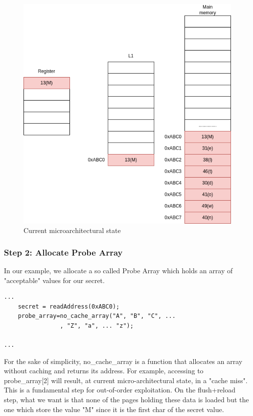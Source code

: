 \begin{figure}[!h]
    \includegraphics[scale=0.25]{img/meltdown-step-one.png}
    \caption{Current microarchitectural state}
\end{figure}


\subsubsection{Step 2: Allocate Probe Array}
In our example, we allocate a so called Probe Array which holds an array of "acceptable" values for our secret.
\begin{Verbatim}[fontsize=\small]
...
    secret = readAddress(0xABC0);
    probe_array=no_cache_array("A", "B", "C", ... 
                , "Z", "a", ... "z");

...
\end{Verbatim}
For the sake of simplicity, no\_cache\_array is a function that allocates an array without caching and returns its address.
For example, accessing to probe\_array[2] will result, at current micro-architectural state, in a "cache miss".
This is a fundamental step for out-of-order exploitation.
On the flush+reload step, what we want is that none of the pages holding these data is loaded but the one which store the value
"M" since it is the first char of the secret value.

